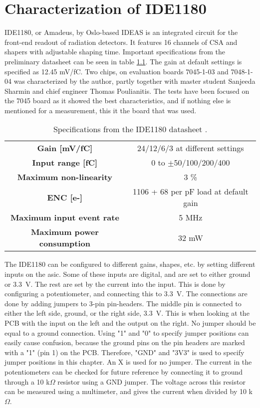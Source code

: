 \documentclass[../main/thesis.tex]{subfiles}
\begin{document}
\newpage

\chapter{Characterization of IDE1180}
\label{ide}

IDE1180, or Amadeus, by Oslo-based IDEAS is an integrated circuit for the front-end readout of radiation detectors. It features 16 channels of \gls{CSA} and shapers with adjustable shaping time. Important specifications from the preliminary datasheet can be seen in table \ref{tab-ide-specs}. The gain at default settings is specified as 12.45 mV/fC. Two chips, on evaluation boards 7045-1-03 and 7048-1-04 was characterized by the author, partly together with master student Sanjeeda Sharmin and chief engineer Thomas Poulianitis. The tests have been focused on the 7045 board as it showed the best characteristics, and if nothing else is mentioned for a measurement, this it the board that was used. 

\begin{table}[h!]
	\begin{center}
		\caption{Specifications from the IDE1180 datasheet \citep{IDE1180}.}
		\label{tab-ide-specs}
		\begin{tabular}{cc}\toprule
			\textbf{Gain [mV/fC]} & 24/12/6/3 at different settings  \\ 
			\textbf{Input range [fC]}     & 0 to $\pm$50/100/200/400  \\
			\textbf{Maximum non-linearity}	&	3 \%	\\
			\textbf{\gls{ENC} [e-]}		& 	1106 + 68 per pF load at default gain \\
			\textbf{Maximum input event rate}	&	5 MHz	\\
			\textbf{Maximum power consumption}	&	32 mW	\\
			 \bottomrule
		\end{tabular}
	\end{center}
\end{table}

The IDE1180 can be configured to different gains, shapes, etc. by setting different inputs on the \gls{asic}. Some of these inputs are digital, and are set to either ground or 3.3~V. The rest are set by the current into the input. This is done by configuring a potentiometer, and connecting this to 3.3~V. The connections are done by adding jumpers to 3-pin pin-headers. The middle pin is connected to either the left side, ground, or the right side, 3.3~V. This is when looking at the \gls{PCB} with the input on the left and the output on the right. No jumper should be equal to a ground connection. Using "1" and "0" to specify jumper positions can easily cause confusion, because the ground pins on the pin headers are marked with a "1" (pin 1) on the \gls{PCB}. Therefore, "GND" and "3V3" is used to specify jumper positions in this chapter.  An X is used for no jumper. The current in the potentiometers can be checked for future reference by connecting it to ground through a 10 k$\Omega$ resistor using a GND jumper. The voltage across this resistor can be measured using a multimeter, and gives the current when divided by 10 k$\Omega$. 
\end{document}
